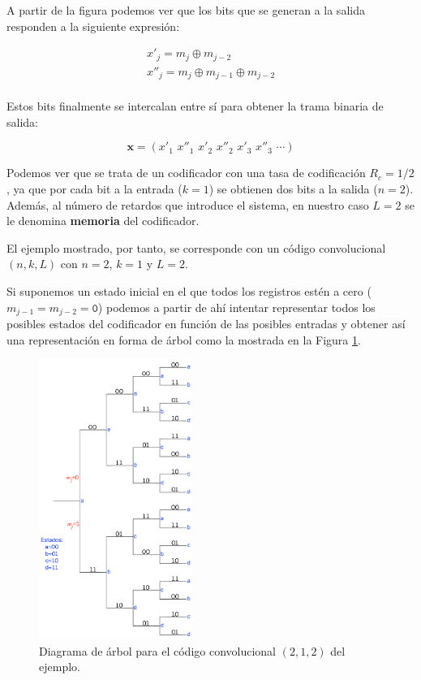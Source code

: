\documentclass[es,apuntes]{uah}
\begin{document}
{A partir de la figura podemos ver que los bits que se generan a la salida responden a la siguiente expresión:

\begin{displaymath}
	\begin{array}{l}
		x'_j = m_j \oplus m_{j-2} \\
		x''_j = m_j \oplus m_{j-1} \oplus m_{j-2} \\
	\end{array}
\end{displaymath}


Estos bits finalmente se intercalan entre sí para obtener la trama binaria de salida:

\begin{displaymath}
	\mathbf{x} = (x'_1 \,\, x''_1 \,\, x'_2 \,\, x''_2 \,\, x'_3 \,\, x''_3 \,\, \cdots )
\end{displaymath}

Podemos ver que se trata de un codificador con una tasa de codificación $R_c = 1/2$, ya que por cada bit a la entrada ($k=1$) se obtienen dos bits a la salida ($n=2$). Además, al número de retardos que introduce el sistema, en nuestro caso $L=2$ se le denomina {\bf memoria} del codificador. 

El ejemplo mostrado, por tanto, se corresponde con un código convolucional $(n,k,L)$ con $n=2$, $k=1$ y $L=2$.

Si suponemos un estado inicial en el que todos los registros estén a cero ($m_{j-1} = m_{j-2} = \mathtt{0}$) podemos a partir de ahí intentar representar todos los posibles estados del codificador en función de las posibles entradas y obtener así una representación en forma de árbol como la mostrada en la Figura \ref{fig:ArbolCodigoConvolucional}. 

\begin{figure}
	\centering\includegraphics[width=5cm]{./Figuras/ArbolCodigoConvolucional}
		\caption{Diagrama de árbol para el código convolucional $(2,1,2)$ del ejemplo.}	
		\label{fig:ArbolCodigoConvolucional}
\end{figure}

}
\end{document}
